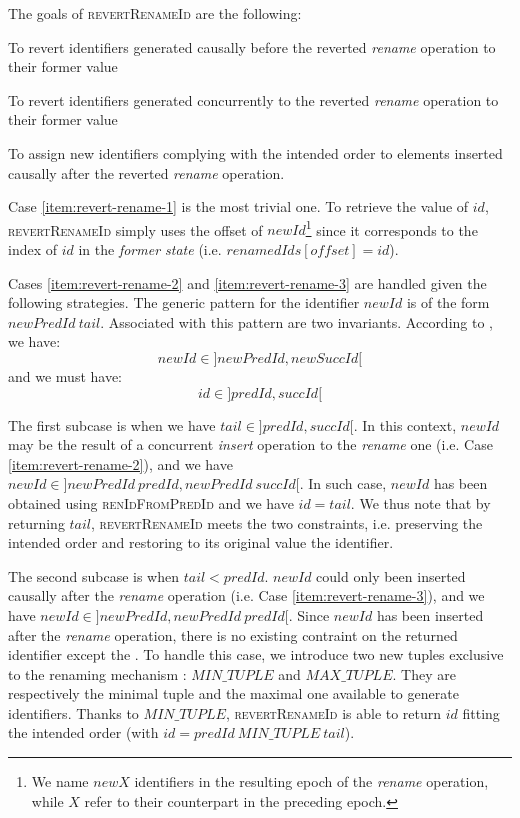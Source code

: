 \documentclass[10pt,journal,compsoc]{IEEEtran}
\newcommand{\ie}{i.e. }
\newcommand{\trm}[1]{\mathit{#1}}
\begin{document}
The goals of \textsc{revertRenameId} are the following:
\begin{enumerate*}[label=(\roman*)]
    \item \label{item:revert-rename-1}
        To revert identifiers generated causally before the reverted \emph{rename} operation to their former value
    \item \label{item:revert-rename-2}
        To revert identifiers generated concurrently to the reverted \emph{rename} operation to their former value
    \item \label{item:revert-rename-3}
        To assign new identifiers complying with the intended order to elements inserted causally after the reverted \emph{rename} operation.
\end{enumerate*}

Case \ref{item:revert-rename-1} is the most trivial one.
To retrieve the value of $\trm{id}$, \textsc{revertRenameId} simply uses the offset of $\trm{newId}$\footnote{We name $\trm{newX}$ identifiers in the resulting epoch of the \emph{rename} operation, while $\trm{X}$ refer to their counterpart in the preceding epoch.} since it corresponds to the index of $\trm{id}$ in the \emph{former state} (\ie $\trm{renamedIds[offset]} = \trm{id}$).

Cases \ref{item:revert-rename-2} and \ref{item:revert-rename-3} are handled given the following strategies.
The generic pattern for the identifier $\trm{newId}$ is of the form $\trm{newPredId~tail}$.
Associated with this pattern are two invariants.
According to , we have:
\[\trm{newId} \in ]\trm{newPredId}, \trm{newSuccId}[\]
and we must have:
\[\trm{id} \in ]\trm{predId}, \trm{succId}[\]

The first subcase is when we have $\trm{tail} \in ]\trm{predId}, \trm{succId}[$.
In this context, $\trm{newId}$ may be the result of a concurrent \emph{insert} operation to the \emph{rename} one (\ie Case \ref{item:revert-rename-2}), and we have $\trm{newId} \in ]\trm{newPredId~predId}, \trm{newPredId~succId}[$.
In such case, $\trm{newId}$ has been obtained using \textsc{renIdFromPredId} and we have $\trm{id} = \trm{tail}$.
We thus note that by returning $\trm{tail}$, \textsc{revertRenameId} meets the two constraints, \ie preserving the intended order and restoring to its original value the identifier.

The second subcase is when $\trm{tail} < \trm{predId}$.
$\trm{newId}$ could only been inserted causally after the \emph{rename} operation (\ie Case \ref{item:revert-rename-3}), and we have $\trm{newId} \in ]\trm{newPredId}, \trm{newPredId~predId}[$.
Since $\trm{newId}$ has been inserted after the \emph{rename} operation, there is no existing contraint on the returned identifier except the .
To handle this case, we introduce two new tuples exclusive to the renaming mechanism : $\trm{MIN\_TUPLE}$ and $\trm{MAX\_TUPLE}$.
They are respectively the minimal tuple and the maximal one available to generate identifiers.
Thanks to $\trm{MIN\_TUPLE}$, \textsc{revertRenameId} is able to return $\trm{id}$ fitting the intended order (with $\trm{id} = \trm{predId~MIN\_TUPLE~tail}$).
\end{document}
